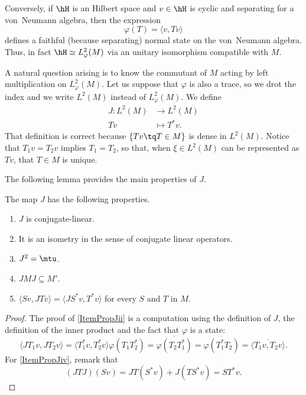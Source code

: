 Conversely, if $\hH$ is an Hilbert space and $v\in\hH$ is cyclic and separating for a von~Neumann algebra, then the expression
\begin{equation}
	\varphi(T)=\langle v, Tv\rangle 
\end{equation}
defines a faithful (because separating) normal state on the von~Neumann algebra. Thus, in fact $\hH\simeq  L_{\varphi}^2(M)$ via an unitary isomorphism compatible with $M$. 

A natural question arising is to know the commutant of $M$ acting by left multiplication on $ L_{\varphi}^2(M)$. Let us suppose that $\varphi$ is also a trace, so we drot the index and we write $ L^2(M)$ instead of $ L_{\varphi}^2(M)$. We define
\begin{equation}
\begin{aligned}
 J\colon  L^2(M)&\to  L^2(M) \\ 
   Tv&\mapsto T^*v. 
\end{aligned}
\end{equation}
That definition is correct because $\{ Tv\tq T\in M \}$ is dense in $L^2(M)$. Notice that $T_1v=T_2v$ implies $T_1=T_2$, so that, when $\xi\in L^2(M)$ can be represented as $Tv$, that $T\in M$ is unique. 

The following lemma provides the main properties of $J$.
\begin{lemma}			\label{LemPropJ}
	The map $J$ has the following properties.
	\begin{enumerate}
		\item $J$ is conjugate-linear.
		\item\label{ItemPropJii} It is an isometry in the sense of conjugate linear operators.
		\item $J^2=\mtu$.
		\item\label{ItemPropJiv} $JMJ\subseteq M'$.
		\item\label{ItemPropJv}  $\langle Sv, JTv\rangle = \langle JS^*v, T^*v\rangle  $ for every $S$ and $T$ in $M$.
	\end{enumerate}
\end{lemma}

\begin{proof}
	The proof of \ref{ItemPropJii} is a computation using the definition of $J$, the definition of the inner product and the fact that $\varphi$ is a state:
	\begin{equation}
		\langle JT_1v, JT_2v\rangle =\langle T_1^*v, T_2^*v\rangle\varphi(T_1T^*_2)=\overline{ \varphi(T_2T_1^*) }=\overline{ \varphi(T_1^*T_2) }=\overline{ \langle T_1v, T_2v\rangle  }.
	\end{equation}
	For \ref{ItemPropJiv}, remark that
	\begin{equation}
		(JTJ)(Sv)=JT(S^*v)+J(TS^*v)=ST^*v.
	\end{equation}
\end{proof}

